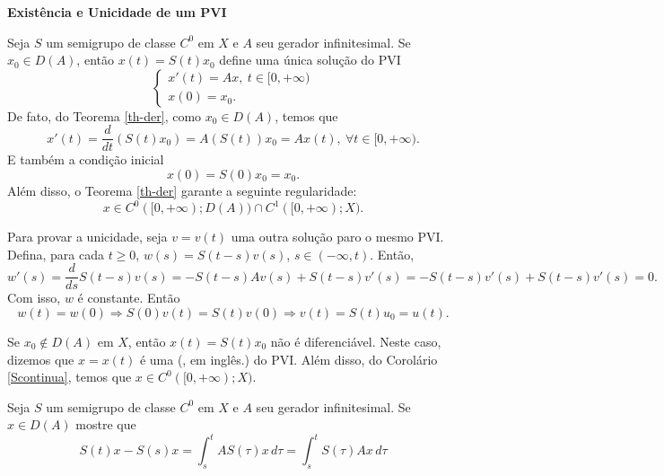 \begin{example} \textbf{Existência e Unicidade de um PVI}

Seja $S$ um semigrupo de classe $C^0$ em $X$ e $A$ seu gerador infinitesimal. Se {$x_0\in D(A)$}, então $x(t)=S(t)x_0$ define {uma única solução} do PVI
\[
\begin{cases}
    x'(t)=Ax,\ t\in [0,+\infty)\\
    x(0)=x_0.
\end{cases}
\]
De fato, do Teorema \ref{th-der}, como $x_0\in D(A)$, temos que
\[x'(t)=\frac{d}{dt}(S(t)x_0)=A(S(t))x_0=Ax(t),\ \forall t\in [0,+\infty).\]
E também a condição inicial
\[x(0)=S(0)x_0=x_0.\]
Além disso, o Teorema \ref{th-der} garante a seguinte regularidade:
\[x\in  C^0([0,+\infty);D(A))\cap C^1([0,+\infty);X).\]

Para provar a unicidade, seja $v=v(t)$ uma outra solução paro o mesmo PVI. Defina, para cada $t\geq 0$,  $w(s)=S(t-s)v(s)$, $s\in (-\infty,t)$. Então,
\[w'(s)=\frac{d}{ds}S(t-s)v(s)=-S(t-s)Av(s)+S(t-s)v'(s)=-S(t-s)v'(s)+S(t-s)v'(s)=0.\]
Com isso, $w$ é constante. Então 
\[w(t)=w(0)\Rightarrow S(0)v(t)=S(t)v(0)\Rightarrow v(t)=S(t)u_0=u(t).\]


Se {$x_0\not\in D(A)$} em $X$, então $x(t)=S(t)x_0$ {\color{red}não é diferenciável}. Neste caso, dizemos que $x=x(t)$ é uma  (, em inglês.)  do PVI. Além disso, do Corolário \ref{Scontinua}, temos que $x\in C^0([0,+\infty);X)$.
\end{example}

\begin{xca}
Seja $S$ um semigrupo de classe $C^0$ em $X$ e $A$ seu gerador infinitesimal. Se $x\in D(A)$ mostre que
\begin{equation}\label{TFC1}
S(t)x-S(s)x=\int_s^t AS(\tau)x\,d\tau =\int_s^t S(\tau)Ax\,d\tau
\end{equation}
\end{xca}

